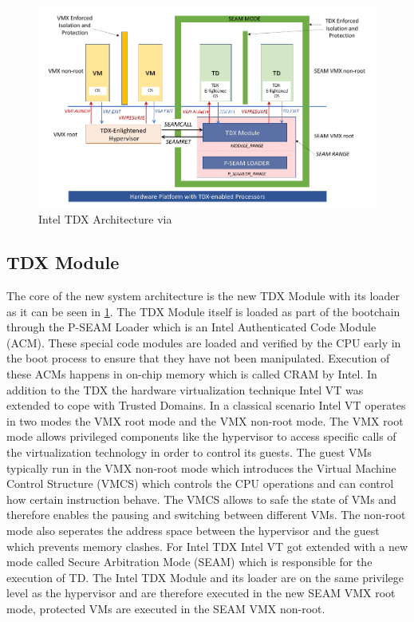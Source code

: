 \documentclass[sigplan,screen,nonacm]{acmart}
\begin{document}
\begin{figure}
  \centering
  \includegraphics[width=\linewidth]{pictures/Intel_TDX_Architecture.png}
  \caption{Intel TDX Architecture via \cite{cheng2023intel}}
  \label{fig:tdxarch}
\end{figure}

\subsection{TDX Module}
The core of the new system architecture is the new TDX Module with its loader as it can be seen in \cref{fig:tdxarch}.
The TDX Module itself is loaded as part of the bootchain through the P-SEAM Loader which is an Intel Authenticated Code Module (ACM).
These special code modules are loaded and verified by the CPU early in the boot process to ensure that they have not been manipulated.
Execution of these ACMs happens in on-chip memory which is called CRAM by Intel.
In addition to the TDX the hardware virtualization technique Intel VT was extended to cope with Trusted Domains.
In a classical scenario Intel VT operates in two modes the VMX root mode and the VMX non-root mode.
The VMX root mode allows privileged components like the hypervisor to access specific calls of the virtualization technology in order to control its guests.
The guest VMs typically run in the VMX non-root mode which introduces the Virtual Machine Control Structure (VMCS) which controls the CPU operations and can control how certain instruction behave. The VMCS allows to safe the state of VMs and therefore enables the pausing and switching between different VMs.
The non-root mode also seperates the address space between the hypervisor and the guest which prevents memory clashes\cite{VTx}.
For Intel TDX Intel VT got extended with a new mode called Secure Arbitration Mode (SEAM) which is responsible for the execution of TD.
The Intel TDX Module  and its loader are on the same privilege level as the hypervisor and are therefore executed in the new SEAM VMX root mode, protected VMs are executed in the SEAM VMX non-root.
\end{document}
